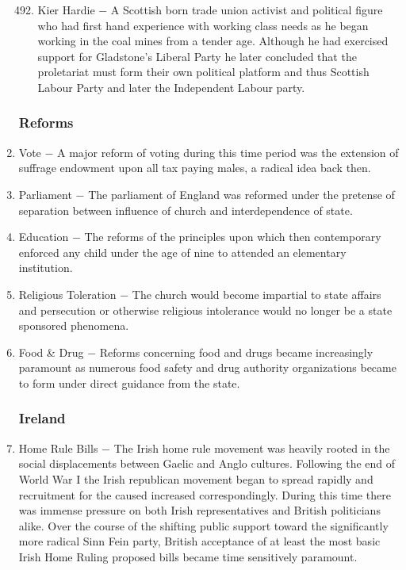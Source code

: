 \documentclass[12pt]{article}
\begin{document}
\begin{enumerate}
\begin{enumerate}[label=\arabic{*}.]
\setcounter{enumii}{491}

\item Kier Hardie $-$ A Scottish born trade union activist and political figure who had first hand experience with working class needs as he began working in the coal mines from a tender age. Although he had exercised support for Gladstone's Liberal Party he later concluded that the proletariat must form their own political platform and thus Scottish Labour Party and later the Independent Labour party.

\end{enumerate}
\setcounter{enumi}{492}

\subsubsection{Reforms}

\item Vote $-$ A major reform of voting during this time period was the extension of suffrage endowment upon all tax paying males, a radical idea back then. 

\item Parliament $-$ The parliament of England was reformed under the pretense of separation between influence of church and interdependence of state.

\item Education $-$ The reforms of the principles upon which then contemporary enforced any child under the age of nine to attended an elementary institution.

\item Religious Toleration $-$ The church would become impartial to state affairs and persecution or otherwise religious intolerance would no longer be a state sponsored phenomena.

\item Food \& Drug $-$ Reforms concerning food and drugs became increasingly paramount as numerous food safety and drug authority organizations became to form under direct guidance from the state.

\subsubsection{Ireland}

\item Home Rule Bills $-$ The Irish home rule movement was heavily rooted in the social displacements between Gaelic and Anglo cultures. Following the end of World War I the Irish republican movement began to spread rapidly and recruitment for the caused increased correspondingly. During this time there was immense pressure on both Irish representatives and British politicians alike. Over the course of the shifting public support toward the significantly more radical Sinn Fein party, British acceptance of at least the most basic Irish Home Ruling proposed bills became time sensitively paramount.


\end{enumerate}
\end{document}
